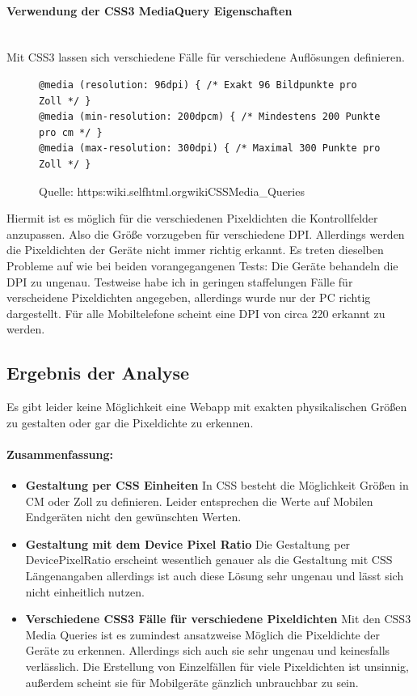 \paragraph{Verwendung der CSS3 MediaQuery Eigenschaften}
\mbox{}\\
Mit CSS3 lassen sich verschiedene Fälle für verschiedene Auflösungen definieren.
\begin{figure}[ht]
	\centering
	\begin{lstlisting}
@media (resolution: 96dpi) { /* Exakt 96 Bildpunkte pro Zoll */ }
@media (min-resolution: 200dpcm) { /* Mindestens 200 Punkte pro cm */ }
@media (max-resolution: 300dpi) { /* Maximal 300 Punkte pro Zoll */ }
	\end{lstlisting}
	\caption{Quelle: https:\/\/wiki.selfhtml.org\/wiki\/CSS\/Media\_Queries}
	\label{figx}
\end{figure}
\newline
Hiermit ist es möglich für die verschiedenen Pixeldichten die Kontrollfelder anzupassen. Also die Größe vorzugeben für verschiedene DPI.
Allerdings werden die Pixeldichten der Geräte nicht immer richtig erkannt. Es treten dieselben Probleme auf wie bei beiden vorangegangenen Tests: Die Geräte behandeln die DPI zu ungenau. 
\newline
Testweise habe ich in geringen staffelungen Fälle für verscheidene Pixeldichten angegeben, allerdings wurde nur der PC richtig dargestellt. Für alle Mobiltelefone scheint eine DPI von circa 220 erkannt zu werden.
\newpage
\subsection{Ergebnis der Analyse}
Es gibt leider keine Möglichkeit eine Webapp mit exakten physikalischen Größen zu gestalten oder gar die Pixeldichte zu erkennen.
\paragraph{Zusammenfassung:}
\begin{itemize}
\item
\textbf{Gestaltung per CSS Einheiten} In CSS besteht die Möglichkeit Größen in CM oder Zoll zu definieren. Leider entsprechen die Werte auf Mobilen Endgeräten nicht den gewünschten Werten.
\item
\textbf{Gestaltung mit dem Device Pixel Ratio} Die Gestaltung per DevicePixelRatio erscheint wesentlich genauer als die Gestaltung mit CSS Längenangaben allerdings ist auch diese Lösung sehr ungenau und lässt sich nicht einheitlich nutzen. 
\item
\textbf{Verschiedene CSS3 Fälle für verschiedene Pixeldichten}
Mit den CSS3 Media Queries ist es zumindest ansatzweise Möglich die Pixeldichte der Geräte zu erkennen. Allerdings sich auch sie sehr ungenau und keinesfalls verlässlich.
Die Erstellung von Einzelfällen für viele Pixeldichten ist unsinnig, außerdem scheint sie für Mobilgeräte gänzlich unbrauchbar zu sein.
\end{itemize}

